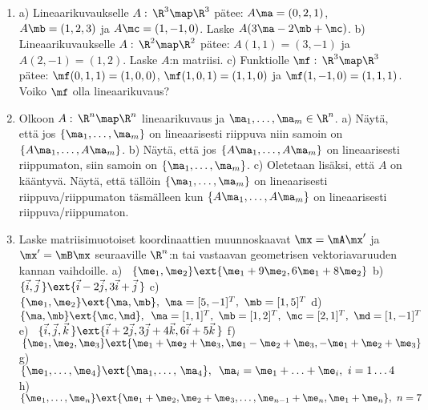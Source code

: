 \Harj
\begin{enumerate}

\item
a) Lineaarikuvaukselle $A:\,\R^3\map\R^3$ pätee: $A\ma=(0,2,1)$, $A\mb=(1,2,3)$ ja
$A\mc=(1,-1,0)$. Laske $A(3\ma-2\mb+\mc)$. \newline
b) Lineaarikuvaukselle $A:\,\R^2\map\R^2$ pätee: $A(1,1)=(3,-1)$ ja $A(2,-1)=(1,2)$. Laske
$A$:n matriisi. \newline
c) Funktiolle $\mf:\,\R^3\map\R^3$ pätee: $\mf(0,1,1)=(1,0,0)$, $\mf(1,0,1)=(1,1,0)$ ja
$\mf(1,-1,0)=(1,1,1)$. Voiko $\mf$ olla lineaarikuvaus?

\item
Olkoon $A:\,\R^n\map\R^n$ lineaarikuvaus ja $\ma_1,\ldots,\ma_m\in\R^n$. \newline
a) Näytä, että jos $\{\ma_1,\ldots,\ma_m\}$ on lineaarisesti riippuva niin samoin on 
$\{A\ma_1,\ldots,A\ma_m\}$. \newline
b) Näytä, että jos $\{A\ma_1,\ldots,A\ma_m\}$ on lineaarisesti riippumaton, siin samoin on
$\{\ma_1,\ldots,\ma_m\}$. \newline
 c) Oletetaan lisäksi, että $A$ on kääntyvä. Näytä, että tällöin $\{\ma_1,\ldots,\ma_m\}$ on 
lineaarisesti riippuva/riippumaton täsmälleen kun $\{A\ma_1,\ldots,A\ma_m\}$ on lineaarisesti 
riippuva/riippumaton.

\item
Laske matriisimuotoiset koordinaattien muunnoskaavat $\mx=\mA\mx'$ ja $\mx'=\mB\mx$ seuraaville
$\R^n$:n tai vastaavan geometrisen vektoriavaruuden kannan vaihdoille. \vspace{1mm}\newline
a) \ $\{\me_1,\me_2\} \ext \{\me_1+9\me_2,6\me_1+8\me_2\}$ \vspace{1mm}\newline
b) \ $\{\vec i,\vec j\,\} \ext \{\vec i-2\vec j,3\vec i+\vec j\,\}$ \vspace{0.3mm}\newline
c) \ $\{\me_1,\me_2\} \ext \{\ma,\mb\},\ \ma=[5,-1]^T,\ \mb=[1,5]^T$ \vspace{1mm}\newline
d) \ $\{\ma,\mb\} \ext \{\mc,\md\},\,\ \ma=[1,1]^T,\ \mb=[1,2]^T,\ \mc=[2,1]^T,\ \md=[1,-1]^T$
\vspace{0.5mm}\newline
e) \ $\{\vec i,\vec j,\vec k\,\} \ext \{\vec i+2\vec j,3\vec j+4\vec k,6\vec i+5\vec k\,\}$
\vspace{1mm}\newline
f) \ $\,\{\me_1,\me_2,\me_3\} \ext \{\me_1+\me_2+\me_3,\me_1-\me_2+\me_3,-\me_1+\me_2+\me_3\}$
\vspace{0.8mm}\newline
g) \ $\{\me_1,\ldots,\me_4\} \ext \{\ma_1,\ldots,\,\ma_4\},\,\ \ma_i=\me_1+\ldots+\me_i,\ 
i=1 \ldots 4$ \vspace{1.5mm}\newline
h) \ $\{\me_1,\ldots,\me_n\}\ext\{\me_1+\me_2,\me_2+\me_3,\ldots,\me_{n-1}+\me_n,\me_1+\me_n\},\
     n=7$


\end{enumerate}
